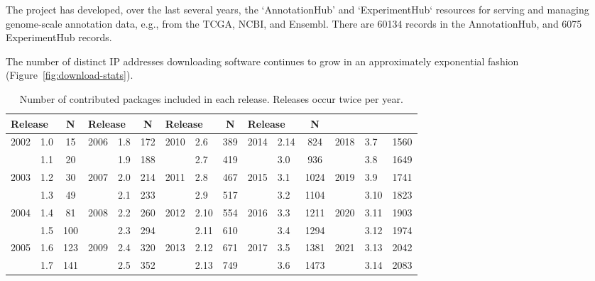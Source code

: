 \documentclass[letterpaper]{article}
\begin{document}
The project has developed, over the last several years, the
`AnnotationHub' and `ExperimentHub` resources for serving and managing
genome-scale annotation data, e.g., from the TCGA, NCBI, and
Ensembl. There are 60134 records in the AnnotationHub, and 6075
ExperimentHub records.

The number of distinct IP addresses downloading software continues to
grow in an approximately exponential fashion
(Figure~\ref{fig:download-stats}).

\begin{table}
  \begin{center}
    \caption{Number of contributed packages included in each
      \Bioconductor{} release.  Releases occur twice per year.}
    \label{tbl:analysis_pkgs}
    \begin{tabular}{llc|llc|llc|llc|llc}
      \\
      \multicolumn{2}{l}{Release} & N & 
      \multicolumn{2}{l}{Release} & N & 
      \multicolumn{2}{l}{Release} & N &
      \multicolumn{2}{l}{Release} & N \\\hline\noalign{\smallskip}
      2002 & 1.0 & 15    & 2006 & 1.8 & 172  & 2010 & 2.6 & 389 & 2014 & 2.14 & 824  & 2018 & 3.7  & 1560\\ 
           & 1.1 & 20    &      & 1.9 & 188  &      & 2.7 & 419 &      & 3.0  & 936  &      & 3.8  & 1649\\
      2003 & 1.2 & 30    & 2007 & 2.0 & 214  & 2011 & 2.8 & 467 & 2015 & 3.1  & 1024 & 2019 & 3.9  & 1741\\
           & 1.3 & 49    &      & 2.1 & 233  &      & 2.9 & 517 &      & 3.2  & 1104 &      & 3.10 & 1823\\
      2004 & 1.4 & 81    & 2008 & 2.2 & 260  & 2012 & 2.10 & 554& 2016 & 3.3  & 1211 & 2020 & 3.11 & 1903\\
           & 1.5 & 100   &      & 2.3 & 294  &      & 2.11 & 610&      & 3.4  & 1294 &      & 3.12 & 1974\\
      2005 & 1.6 & 123   & 2009 & 2.4 & 320  & 2013 & 2.12 & 671& 2017 & 3.5  & 1381 & 2021 & 3.13 & 2042\\
           & 1.7 & 141   &      & 2.5 & 352  &      & 2.13 & 749&      & 3.6  & 1473 &      & 3.14 & 2083\\
    \end{tabular}
  \end{center}
\end{table}
\end{document}
